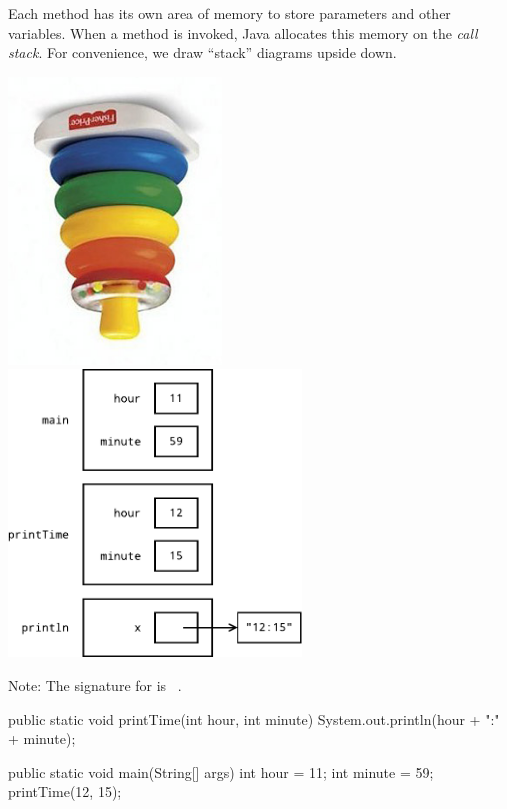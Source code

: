 
Each method has its own area of memory to store parameters and other variables.
When a method is invoked, Java allocates this memory on the \emph{call stack}.
For convenience, we draw ``stack'' diagrams upside down.

\begin{center}
\includegraphics[height=3in]{stack-rings1.png}
\hspace{1em}
\includegraphics[height=3in]{stack1.pdf}
\end{center}

\begin{center}
Note: The signature for  is ~.
\end{center}

\begin{javalst}
    public static void printTime(int hour, int minute) {
        System.out.println(hour + ":" + minute);
    }
    
    public static void main(String[] args) {
        int hour = 11;
        int minute = 59;
        printTime(12, 15);
    }
\end{javalst}


